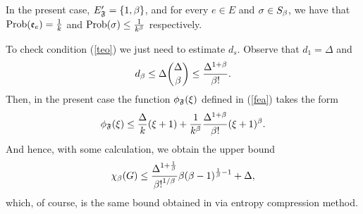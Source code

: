 \documentclass[11pt]{article}
\let\D=\Delta \let\F=\Phi \let\G=\Gamma \let\L=\Lambda \let\Th=\Theta
\let\\=\noindent
\def\ee{\end{equation}}
\def\be{\begin{equation}}
\def\vv{\vskip.2cm}
\let\D=\Delta \let\F=\Phi \let\G=\Gamma \let\L=\Lambda \let\Th=\Theta
\let\\=\noindent
\def\ee{\end{equation}}
\def\be{\begin{equation}}
\def\vv{\vskip.2cm}
\def \red{\textcolor[rgb]{1.00,0.00,0.00}}
\def\prob{{\rm Prob}}
\def\ev{{\mathfrak{e}}}
\def\EA{{E_{\cal A}}}
\def\FF{{\mathfrak{F}}}
\def\red{\color{Red}}
\begin{document}
\\In the present case, $E'_\FF=\{1, \b\}$,
and for  every $e \in E$ and $\sigma \in S_\beta$, we have that $\prob(\ev_e)= \frac{1}{k}$ and $\prob(\s) \leq \frac{1}{k^{\b}}$ respectively.

\\To check condition (\ref{teo}) we just need to  estimate $d_s$. Observe that $d_{1}= \D$ and
$$
d_{\b}\le \D {\D\choose\b}\le {\frac{\D^{1+\b}}{ \b!}}.
$$
Then, in the present case the function $\phi_{\FF}(\x)$ defined in (\ref{fea}) takes the form
$$
\phi_{\FF}(\x)\leq \frac{\D}{k} (\x+1) + \frac{1}{k^{\b}} {\frac{\D^{1+\b}}{ \b!}} (\x+1)^{\b}.
$$
And hence, with some calculation, we obtain the upper bound
$$
\ch_\b(G)\le {\D^{1+ \frac{1}{\b}}\over {\b!}^{1/\b}} \b{(\b-1)^{\frac{1}{\b}-1}} + \D,
$$
which, of course, is the same bound obtained in \cite{APS} via entropy compression method.



\end{document}
